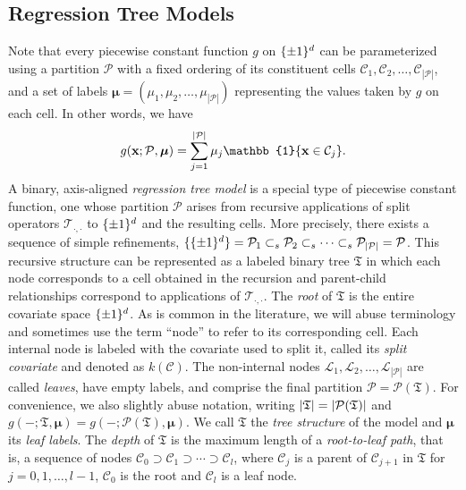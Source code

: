 \documentclass[11pt]{article}
\newcommand{\bx}{\mathbf{x}}
\newcommand{\bmu}{\boldsymbol{\mu}}
\DeclarePairedDelimiter{\braces}{\lbrace}{\rbrace}
\DeclarePairedDelimiter{\abs}{|}{|}
\newcommand{\indicator}{\mathbb{1}}
\newcommand{\tree}{\mathfrak{T}}
\newcommand{\cell}{\mathcal{C}}
\newcommand{\leaf}{\mathcal{L}}
\newcommand{\partition}{\mathcal{P}}
\newcommand{\binspace}{\braces{\pm 1}^\nfeats}
\newcommand{\sparsity}{s}
\newcommand{\nfeats}{d}
\newcommand{\splitoperator}{\mathcal{T}}
\newcommand{\piecewise}{g}
\newcommand{\splitfeature}{k}
\begin{document}
\subsection{Regression Tree Models}

Note that every piecewise constant function $\piecewise$ on $\binspace$ can be parameterized using a partition $\partition$ with a fixed ordering of its constituent cells $\cell_1,\cell_2,\ldots,\cell_{|\partition|}$, and a set of labels $\bmu = (\mu_1,\mu_2,\ldots,\mu_{|\partition|})$ representing the values taken by $\piecewise$ on each cell.
In other words, we have
\begin{equation} 
    g(\bx;\partition,\bmu) = \sum_{j=1}^{|\partition|} \mu_j \indicator\braces*{\bx \in \cell_j}.
\end{equation}
A binary, axis-aligned \emph{regression tree model} is a special type of piecewise constant function, one whose partition $\partition$ arises from recursive applications of split operators $\splitoperator_{\cdot,\cdot}$ to $\binspace$ and the resulting cells.
More precisely, there exists a sequence of simple refinements, 
$\lbrace \binspace \rbrace = \partition_1 \subset_s \partition_2 \subset_s \cdots \subset_s \partition_{|\partition|} = \partition$.
This recursive structure can be represented as a labeled binary tree $\tree$ in which each node corresponds to a cell obtained in the recursion and parent-child relationships correspond to applications of $\splitoperator_{\cdot,\cdot}$.
The \emph{root} of $\tree$ is the entire covariate space $\binspace$.
As is common in the literature, we will abuse terminology and sometimes use the term ``node'' to refer to its corresponding cell.
Each internal node is labeled with the covariate used to split it, called its \emph{split covariate} and denoted as $\splitfeature(\cell)$.
The non-internal nodes $\leaf_1,\leaf_2,\ldots,\leaf_{|\partition|}$ are called \emph{leaves}, have empty labels, and comprise the final partition $\partition = \partition(\tree)$.
For convenience, we also slightly abuse notation, writing $\abs*{\tree} = \abs*{\partition(\tree)}$ and $g(-;\tree,\bmu) = g(-;\partition(\tree),\bmu)$.
We call $\tree$ the \emph{tree structure} of the model and $\bmu$ its \emph{leaf labels}.
The \emph{depth} of $\tree$ is the maximum length of a \emph{root-to-leaf path}, that is, a sequence of nodes $\cell_0 \supset \cell_1 \supset \cdots \supset \cell_l$, where $\cell_j$ is a parent of $\cell_{j+1}$ in $\tree$ for $j=0,1,\ldots,{l-1}$, $\cell_0$ is the root and $\cell_l$ is a leaf node.
\end{document}
